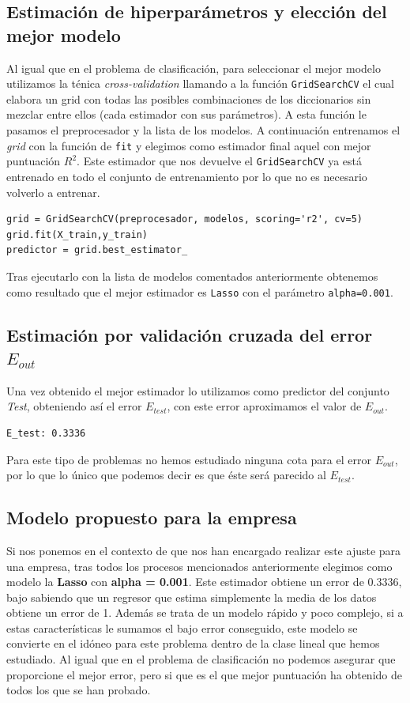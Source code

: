 \documentclass[size=a4, parskip=half, titlepage=false, toc=flat, toc=bib, 12pt]{scrartcl}
\begin{document}
\subsection{Estimación de hiperparámetros y elección del mejor modelo}

Al igual que en el problema de clasificación, para seleccionar el mejor modelo utilizamos la ténica \textit{cross-validation} llamando a la función \verb|GridSearchCV| el cual elabora un grid con todas las posibles combinaciones de los diccionarios sin mezclar entre ellos (cada estimador con sus parámetros). A esta función le pasamos el preprocesador y la lista de los modelos. A continuación entrenamos el \textit{grid} con la función de \verb|fit| y elegimos como estimador final aquel con mejor puntuación $R^2$. Este estimador que nos devuelve el \verb|GridSearchCV| ya está entrenado en todo el conjunto de entrenamiento por lo que no es necesario volverlo a entrenar.
\begin{verbatim}
grid = GridSearchCV(preprocesador, modelos, scoring='r2', cv=5)
grid.fit(X_train,y_train)
predictor = grid.best_estimator_
\end{verbatim}
Tras ejecutarlo con la lista de modelos comentados anteriormente obtenemos como resultado que el mejor estimador es \verb|Lasso| con el parámetro  \verb|alpha=0.001|.
\subsection{Estimación por validación cruzada del error $E_{out}$}
Una vez obtenido el mejor estimador lo utilizamos como predictor del conjunto \textit{Test}, obteniendo así el error $E_{test}$, con este error aproximamos el valor de $E_{out}$.
\begin{verbatim}
E_test: 0.3336
\end{verbatim}
Para este tipo de problemas no hemos estudiado ninguna cota para el error $E_{out}$, por lo que lo único que podemos decir es que éste será parecido al $E_{test}$.
\subsection{Modelo propuesto para la empresa}
Si nos ponemos en el contexto de que nos han encargado realizar este ajuste para una empresa, tras todos los procesos mencionados anteriormente elegimos como modelo la \textbf{Lasso} con \textbf{alpha = 0.001}. Este estimador obtiene un error de $0.3336$, bajo sabiendo que un regresor que estima simplemente la media de los datos obtiene un error de 1. Además se trata de un modelo rápido y poco complejo, si a estas características le sumamos el bajo error conseguido, este modelo se convierte en el idóneo para este problema dentro de la clase lineal que hemos estudiado. Al igual que en el problema de clasificación no podemos asegurar que proporcione el mejor error, pero si que es el que mejor puntuación ha obtenido de todos los que se han probado.

\end{document}
